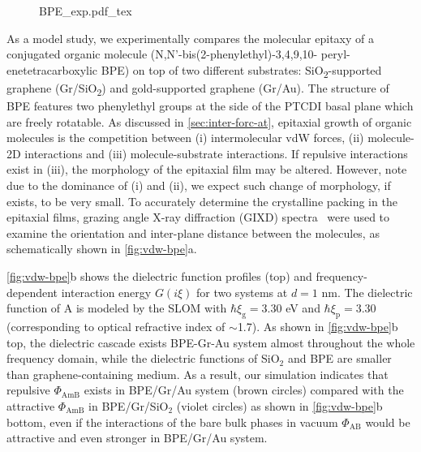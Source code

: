 \begin{figure}[h!]
  \centering{}
  {BPE_exp.pdf_tex}
  \caption{\label{fig:vdw-bpe}}
\end{figure}

%

As a model study, we experimentally compares the molecular
epitaxy of a conjugated organic molecule (N,N’-bis(2-phenyl\-ethyl)-3,4,9,10- peryl-ene\-tetra\-carboxylic BPE) on top of two different
substrates: SiO\textsubscript{2}-supported graphene
(Gr/SiO\textsubscript{2}) and gold-supported graphene (Gr/Au).
The structure of BPE features two phenyl\-ethyl groups at the side of
the PTCDI basal plane which are freely rotatable. 
%
As discussed in \autoref{sec:inter-forc-at}, epitaxial growth of
organic molecules is the competition between (i) intermolecular vdW
forces, (ii) molecule-2D interactions and (iii) molecule-substrate
interactions.
%
If repulsive interactions exist in (iii), the morphology of the
epitaxial film may be altered.  However, note due to the dominance of (i) and
(ii), we expect such change of morphology, if exists, to be very
small.
%
To accurately determine the crystalline packing in the epitaxial
films, grazing angle X-ray diffraction (GIXD)
spectra~\cite{Shih_2015_PartiallyScreened} were used to examine the
orientation and inter-plane distance between the molecules, as
schematically shown in \autoref{fig:vdw-bpe}a.
%

\autoref{fig:vdw-bpe}b shows the dielectric function profiles (top)
and frequency-dependent interaction energy $G(i \xi)$ for two systems
at $d=1$ nm.
%
The dielectric function of A is modeled by the SLOM with
$\hbar \xi_{\mathrm{g}}=3.30$ eV and $\hbar \xi_{\mathrm{p}}=3.30$
(corresponding to optical refractive index of $\sim{}$1.7).
%
As shown in \autoref{fig:vdw-bpe}b top, the dielectric cascade exists
BPE-Gr-Au system almost throughout the whole frequency domain, while
the dielectric functions of SiO$_{2}$ and BPE are smaller than graphene-containing medium.
%
As a result, our simulation indicates that repulsive
$\Phi_{\mathrm{AmB}}$ exists in BPE/Gr/Au system (brown circles)
compared with the attractive $\Phi_{\mathrm{AmB}}$ in BPE/Gr/SiO$_{2}$
(violet circles) as shown in \autoref{fig:vdw-bpe}b bottom, even if
the interactions of the bare bulk phases in vacuum
$\Phi_{\mathrm{AB}}$ would be attractive and even stronger in
BPE/Gr/Au system.
%
%

